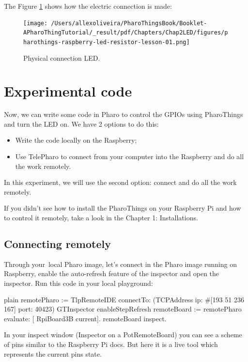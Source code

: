 \documentclass[10pt,twoside,english]{_support/latex/sbabook/sbabook}
\begin{document}
The Figure \ref{physicalLed} shows how the electric connection is made:


\begin{figure}

\begin{center}
\texttt{[image: /Users/allexoliveira/PharoThingsBook/Booklet-APharoThingTutorial/\_result/pdf/Chapters/Chap2LED/figures/pharothings-raspberry-led-resistor-lesson-01.png]}\caption{Physical connection LED.\label{physicalLed}}\end{center}
\end{figure}

\section{Experimental code}


Now, we can write some code in Pharo to control the GPIOs using PharoThings and turn the LED on. We have 2 options to do this:

\begin{itemize}
\item Write the code locally on the Raspberry;
\item Use TelePharo to connect from your computer into the Raspberry and do all the work remotely.
\end{itemize}

In this experiment, we will use the second option: connect and do all the work remotely. 

If you didn’t see how to install the PharoThings on your Raspberry Pi and how to control it remotely, take a look in the Chapter 1: Installations.
\subsection{Connecting remotely}
Through your local Pharo image, let's connect in the Pharo image running on Raspberry, enable the auto-refresh feature of the inspector and open the inspector. Run this code in your local playground:

\begin{displaycode}{plain}
remotePharo := TlpRemoteIDE connectTo: (TCPAddress ip: #[193 51 236 167] port: 40423)
GTInspector enableStepRefresh
remoteBoard := remotePharo evaluate: [ RpiBoard3B current].
remoteBoard inspect.
\end{displaycode}

In your inspect window (Inspector on a PotRemoteBoard) you can see a scheme of pins similar to the Raspberry Pi docs. But here it is a live tool which represents the current pins state.
\end{document}
